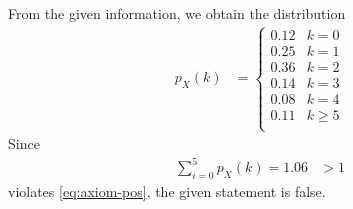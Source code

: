 From the given information, we obtain the distribution
\begin{align}
p_X(k)&=
\begin{cases}
0.12 & k=0\\
0.25 & k=1\\
0.36 & k=2\\
0.14 & k=3\\
0.08 & k=4\\
0.11 & k\geq5\\
\end{cases}
\end{align}
Since
\begin{align}
\sum_{i=0}^5 p_X(k) = 1.06
&>1
\end{align}
	violates \eqref{eq:axiom-pos},
the given statement is false.


